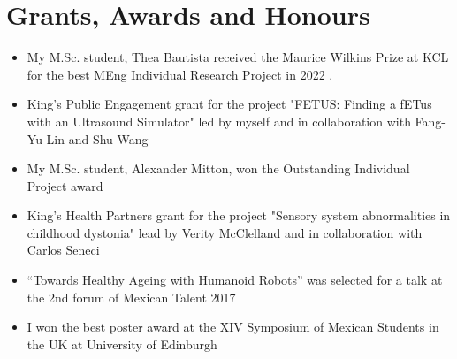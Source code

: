 \documentclass{mycv}
\begin{document}
\section{Grants, Awards and Honours}
\begin{itemize}

\item My M.Sc. student, Thea Bautista received the Maurice Wilkins Prize at KCL for the best MEng Individual Research Project in 2022 \href{https://twitter.com/_mxochicale/status/1564571097932402688}{\faExternalLink*} .

\item King's Public Engagement grant for the project "FETUS: Finding a fETus with an Ultrasound Simulator" led by myself and in collaboration with Fang-Yu Lin and Shu Wang \href{https://cai4cai.ml/post/2021-01-07-miguelpegrant/}{\faExternalLink*} 

\item My M.Sc. student, Alexander Mitton, won the Outstanding Individual Project award 
 \href{https://www.kcl.ac.uk/news/mscmres-healthcare-technologies-award-student-prizes-for-outstanding-performance-and-contributions-to-student-life}{\faExternalLink*} 

\item King's Health Partners grant for the project "Sensory system abnormalities in childhood dystonia" lead by Verity McClelland and in collaboration with Carlos Seneci \href{https://kclpure.kcl.ac.uk/portal/en/persons/miguel-angel-perez-xochicale(cca72683-31b7-496a-8aeb-181fd9d6a8f3)/projects.html}{\faExternalLink*} 

\item ``Towards Healthy Ageing with Humanoid Robots'' was selected for a talk at the 2nd forum of Mexican Talent 2017 \href{https://github.com/mxochicale/InnovationMatchMX/tree/master/2017}{\faExternalLink*} \href{https://github.com/mxochicale/InnovationMatchMX/blob/master/2017/presentation/IMMX-MA-0058.pdf}{\faFilePdf} \href{https://www.youtube.com/watch?v=wNWzpdXdm5U}{\faYoutube} 

\item I won the best poster award at the XIV Symposium of Mexican Students in the UK at University of Edinburgh \href{https://github.com/mxochicale/symposiummx/tree/master/2016}{\faExternalLink*}  


\end{itemize}
\end{document}
